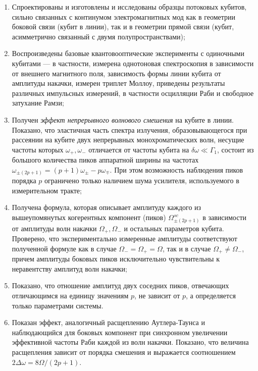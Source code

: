 \begin{enumerate}
  \item Спроектированы и изготовлены и исследованы образцы потоковых кубитов, сильно связанных с континумом электромагнитных мод как в геометрии боковой связи (кубит в линии), так и в геометрии прямой связи (кубит, асимметрично связанный с двумя полупространствами);
  \item Воспроизведены базовые квантовооптические эксперименты с одиночными кубитами --- в частности, измерена однотоновая спектроскопия в зависимости от внешнего магнитного поля, зависимость формы линии кубита от амплитуды накачки, измерен триплет Моллоу, приведены результаты различных импульсных измерений, в частности осцилляции Раби и свободное затухание Рамзи;
  \item Получен \textit{эффект непрерывного волнового смешения} на кубите в линии. Показано, что эластичная часть спектра излучения, образовывающегося при рассеянии на кубите двух непрерывных монохроматических волн, несущие частоты которых $\omega_+, \omega_-$ отличается от частоты кубита на $\delta\omega \ll \Gamma_1$, состоит из большого количества пиков аппаратной ширины на частотах $\omega_{\pm(2p+1)}= (p+1)\omega_{\pm}-p \omega_{\mp}$.  При этом возможность наблюдения пиков порядка $p$ ограничено только наличием шума усилителя, используемого в измерительном тракте;
  \item Получена формула, которая описывает амплитуду каждого из вышеупомянутых когерентных компонент (пиков) $\Omega^{sc}_{\pm(2p+1)}$ в зависимости от амплитуды волн накачки $\Omega_+, \Omega_-$ и остальных параметров кубита. Проверено, что экспериментально измеренные амплитуды соответствуют полученной формуле как в случае $\Omega_- = \Omega _+ = \Omega$, так и в случае $\Omega_+ \ne \Omega_-$, причем амплитуды боковых пиков исключительно чувствительны к неравентству амплитуд волн накачки;
  \item Показано, что отношение амплитуд двух соседних пиков, отвечающих отличающимся на единицу значениям $p$, не зависит от $p$, а определяется только параметрами системы. 
  \item Показан эффект, аналогичный расщеплению Аутлера-Таунса и наблюдающийся для боковых компонент при синхронном увеличении эффективной частоты Раби каждой из волн накачки. Показано, что величина расщепления зависит от порядка смешения и выражается соотношением $2\Delta\omega = 8\Omega/(2p+1)$.

\end{enumerate}
